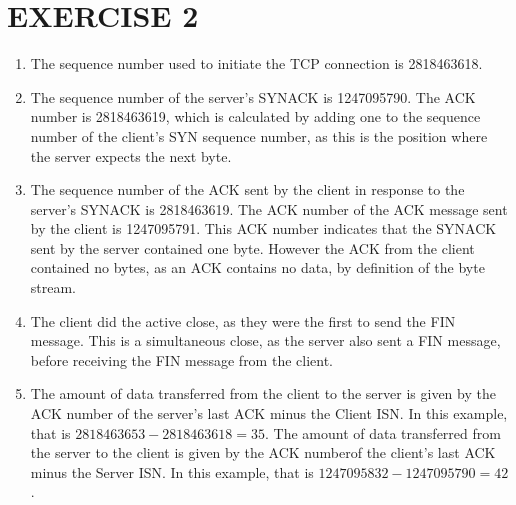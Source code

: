 \documentclass[a4paper,11pt]{article}
\newcommand{\ds}{\displaystyle}
\begin{document}
\section{EXERCISE 2}
\begin{enumerate}[leftmargin=*]
	\item The sequence number used to initiate the TCP connection is 2818463618.
	\item The sequence number of the server's SYNACK is 1247095790. The ACK number is 2818463619, which is calculated by adding one to the sequence number of the client's SYN sequence number, as this is the position where the server expects the next byte.
	\item The sequence number of the ACK sent by the client in response to the server's SYNACK is 2818463619. The ACK number of the ACK message sent by the client is 1247095791. This ACK number indicates that the SYNACK sent by the server contained one byte. However the ACK from the client contained no bytes, as an ACK contains no data, by definition of the byte stream.
	\item The client did the active close, as they were the first to send the FIN message. This is a simultaneous close, as the server also sent a FIN message, before receiving the FIN message from the client.
	\item The amount of data transferred from the client to the server is given by the ACK number of the server's last ACK minus the Client ISN. In this example, that is $\ds{2818463653 - 2818463618 = 35}$. The amount of data transferred from the server to the client is given by the ACK numberof the client's last ACK minus the Server ISN. In this example, that is $\ds{1247095832-1247095790 = 42}$.
\end{enumerate}
\end{document}
